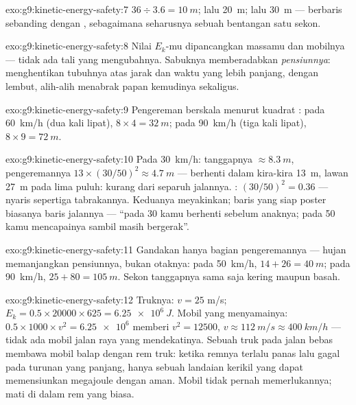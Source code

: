 \begin{solution}{exo:g9:kinetic-energy-safety:7}
$36 \div 3.6 = \qty{10}{m}$; lalu \qty{20}{m}; lalu \qty{30}{m} ---
berbaris sebanding dengan , sebagaimana seharusnya sebuah
bentangan satu sekon.
\end{solution}

\begin{solution}{exo:g9:kinetic-energy-safety:8}
Nilai $E_k$-mu dipancangkan massamu dan  mobilnya --- tidak ada
tali yang mengubahnya. Sabuknya memberadabkan \emph{pensiunnya}:
menghentikan tubuhnya atas jarak dan waktu yang lebih panjang, dengan
lembut, alih-alih menabrak papan kemudinya sekaligus.
\end{solution}

\begin{solution}{exo:g9:kinetic-energy-safety:9}
Pengereman berskala menurut kuadrat : pada \qty{60}{km/h}
(dua kali lipat), $8 \times 4 = \qty{32}{m}$; pada \qty{90}{km/h}
(tiga kali lipat), $8 \times 9 = \qty{72}{m}$.
\end{solution}

\begin{solution}{exo:g9:kinetic-energy-safety:10}
Pada \qty{30}{km/h}: tanggapnya $\approx \qty{8.3}{m}$, pengeremannya
$13 \times (30/50)^2 \approx \qty{4.7}{m}$ --- berhenti dalam
kira-kira \qty{13}{m}, lawan \qty{27}{m} pada lima puluh: kurang dari
separuh jalannya. : $(30/50)^2 = 0.36$ --- nyaris sepertiga
 tabrakannya. Keduanya meyakinkan; baris yang siap poster
biasanya baris jalannya --- ``pada 30 kamu berhenti sebelum anaknya;
pada 50 kamu mencapainya sambil masih bergerak''.
\end{solution}

\begin{solution}{exo:g9:kinetic-energy-safety:11}
Gandakan hanya bagian pengeremannya --- hujan memanjangkan pensiunnya,
bukan otaknya: pada \qty{50}{km/h}, $14 + 26 =
\qty{40}{m}$; pada \qty{90}{km/h}, $25 + 80 = \qty{105}{m}$.
Sekon tanggapnya sama saja kering maupun basah.
\end{solution}

\begin{solution}{exo:g9:kinetic-energy-safety:12}
Truknya: $v = 25$ \unit{m/s}; $E_k = 0.5 \times 20000 \times
625 = \qty{6.25e6}{J}$. Mobil yang menyamainya: $0.5 \times 1000 \times
v^2 = \num{6.25e6}$ memberi $v^2 = 12500$, $v \approx
\qty{112}{m/s} \approx \qty{400}{km/h}$ --- tidak ada mobil jalan raya
yang mendekatinya. Sebuah truk pada  jalan bebas 
membawa  mobil balap dengan rem truk: ketika remnya terlalu
panas lalu gagal pada turunan yang panjang, hanya sebuah landaian
kerikil yang dapat memensiunkan megajoule dengan aman. Mobil tidak
pernah memerlukannya;  mati di dalam rem yang biasa.
\end{solution}

